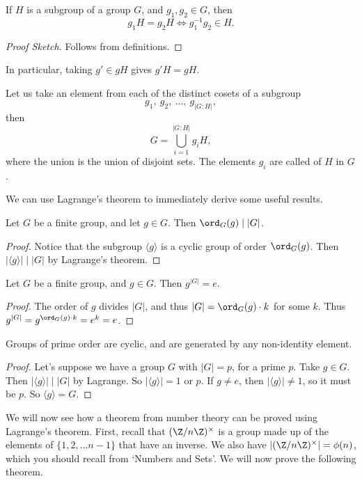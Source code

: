 \documentclass[a4]{scrreprt}
\begin{document}
\begin{proposition}
	If $H$ is a subgroup of a group $G$, and $g_1, g_2 \in G$, then
	$$
	g_1 H = g_2H \iff g_1^{-1} g_2 \in H.
	$$
\end{proposition}
\begin{proof}[Proof Sketch]
	Follows from definitions.
\end{proof}

In particular, taking $g' \in gH$ gives $g'H = gH$.

Let us take an element from each of the distinct cosets of a subgroup
$$
g_1,\ g_2, \ \dots, \ g_{|G:H|},
$$
then
$$
G = \bigcup_{i = 1}^{|G:H|} g_i H,
$$
where the union is the union of disjoint sets. The elements $g_i$ are called  of $H$ in $G$. 

We can use Lagrange's theorem to immediately derive some useful results.

\begin{corollary}
	Let $G$ be a finite group, and let $g \in G$. Then $\ord_G(g) \mid |G|$.
\end{corollary}
\begin{proof}
	Notice that the subgroup $\langle g \rangle$ is a cyclic group of order $\ord_G(g)$. Then $|\langle g \rangle|  \mid |G|$ by Lagrange's theorem.
\end{proof}

\begin{corollary}
	Let $G$ be a finite group, and $g \in G$. Then $g^{|G|} = e$.
\end{corollary}
\begin{proof}
	The order of $g$ divides $|G|$, and thus $|G| = \ord_G(g) \cdot k$ for some $k$. Thus $g^{|G|} = g^{\ord_G(g) \cdot k} = e^k = e$.
\end{proof}

\begin{corollary}\label{cor:primecyclic}
	Groups of prime order are cyclic, and are generated by any non-identity element.
\end{corollary}
\begin{proof}
Let's suppose we have a group $G$ with $|G| = p$, for a prime $p$. Take $g \in G$. Then $|\langle g \rangle| \mid |G|$ by Lagrange. So $|\langle g \rangle | = 1$ or $p$. If $g \neq e$, then $|\langle g \rangle |\neq 1$, so it must be $p$. So $\langle g \rangle = G$. 
\end{proof}

We will now see how a theorem from number theory can be proved using Lagrange's theorem. First, recall that $(\Z/n\Z)^\times$ is a group made up of the elements of $\{1, 2, \dots n - 1\}$ that have an inverse. We also have $|(\Z/n\Z)^\times| = \phi(n)$, which you should recall from `Numbers and Sets'. We will now prove the following theorem.
\end{document}
